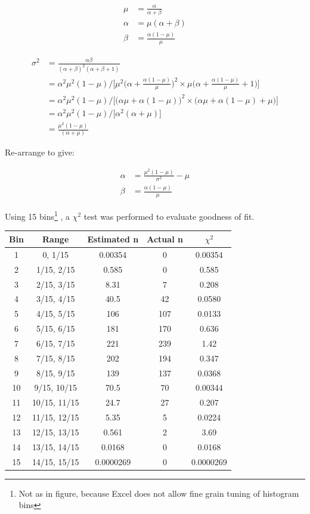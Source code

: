 \documentclass[10pt,a4paper]{article}
\begin{document}
\begin{align*}
	\mu &= \frac{\alpha}{\alpha + \beta}\\
	\alpha &= \mu(\alpha + \beta)\\
	\beta &= \frac{\alpha(1-\mu)}{\mu}
\end{align*}

\begin{align*}
	\sigma^2 &= \frac{\alpha\beta}{(\alpha+\beta)^2(\alpha+\beta+1)}\\
	&=\alpha^2\mu^2(1-\mu)\bigg/\bigg[\mu^2\bigg(\alpha + \frac{\alpha(1-\mu)}{\mu}\bigg)^2 \times \mu\bigg(\alpha + \frac{\alpha(1-\mu)}{\mu} + 1\bigg)\bigg]\\
	&=\alpha^2\mu^2(1-\mu)\bigg/\bigg[\bigg(\alpha\mu + \alpha(1-\mu)\bigg)^2 \times \bigg(\alpha\mu + \alpha(1-\mu) + \mu\bigg)\bigg]\\
	&=\alpha^2\mu^2(1-\mu)\bigg/\bigg[\alpha^2(\alpha+\mu)\bigg]\\	
	&= \frac{\mu^2(1-\mu)}{(\alpha+\mu)}
\end{align*}

Re-arrange to give:

\begin{align*}
	\alpha &= \frac{\mu^2(1-\mu)}{\sigma^2} - \mu\\
	\beta &= \frac{\alpha(1-\mu)}{\mu}
\end{align*}

Using 15 bins\footnote{Not as in figure, because Excel does not allow fine grain tuning of histogram bins} , a \(\chi^2\) test was performed to evaluate goodness of fit.
\begin{table} [H]
	\centering
	\begin{tabular}{c|c|c|c|c} 
		Bin	&  Range & Estimated n & Actual n & \(\chi^2\)\\ 
		\hline 
		1	&  0, 1/15 & 0.00354 & 0 & 0.00354\\  
		2	&  1/15, 2/15 & 0.585 & 0 & 0.585\\ 
		3	&  2/15, 3/15 & 8.31 & 7 & 0.208\\ 
		4	&  3/15, 4/15 & 40.5 & 42 & 0.0580\\ 
		5	&  4/15, 5/15 & 106 & 107 & 0.0133\\ 
		6	&  5/15, 6/15 & 181 & 170 & 0.636\\ 
		7	&  6/15, 7/15 & 221 & 239 & 1.42\\ 
		8	&  7/15, 8/15 & 202 & 194 & 0.347\\ 
		9	&  8/15, 9/15 & 139 & 137 & 0.0368\\ 
		10	&  9/15, 10/15 & 70.5 & 70 & 0.00344\\ 
		11	&  10/15, 11/15 & 24.7 & 27 & 0.207\\ 
		12	&  11/15, 12/15 & 5.35 & 5 & 0.0224\\ 
		13	&  12/15, 13/15 & 0.561 & 2 & 3.69\\ 
		14	&  13/15, 14/15 & 0.0168 & 0 & 0.0168\\ 
		15	&  14/15, 15/15 & 0.0000269 & 0 & 0.0000269\\ 
	\end{tabular} 
\end{table}
\end{document}
